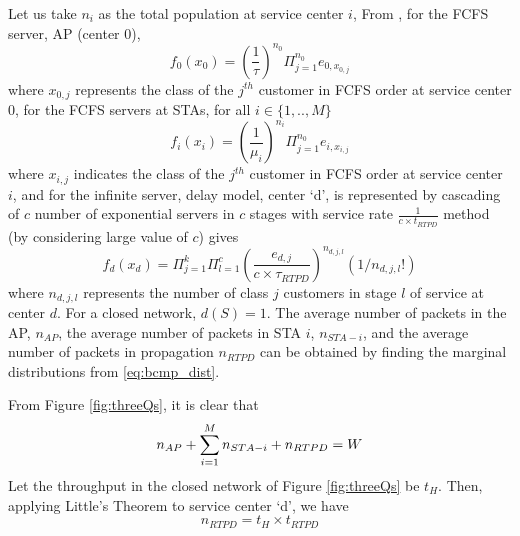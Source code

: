 \documentclass[conference]{IEEEtran}
\begin{document}
 Let us take $n_i$ as  the total population at service center $i$,
From \cite{astn_model:bcmp}, for the FCFS server, AP (center 0),
\begin{equation}
f_0(x_0) =  \left( \frac{1}{\tau} \right) ^{n_0} \Pi _{j=1}^{n_0} e_{0,x_{0,j} }
\end{equation}
where $ x_{0,j} $ represents the class of the $j^{th}$ customer in FCFS order at service center 0,
for the FCFS servers at STAs, for all $ i \in \lbrace  1,.., M \rbrace $
\begin{equation}
f_i(x_i) = \left( \frac{1}{ \mu_{i}} \right) ^{n_{i}} \Pi _{j=1}^{n_0} e_{i,x_{i,j} }
\end{equation}
where $x_{i,j}$ indicates the class of the $j^{th}$ customer in FCFS order at service center $i$,
and for the infinite server, delay model, center `d', is represented by
cascading of $c$ number of exponential servers in $c$ stages with service rate
$ \frac{1}{c \times t_{RTPD}} $  method (by considering large value of $c$) gives 
\begin{equation}
f_d(x_d) =  \Pi _{j=1}^{k} \Pi _{l=1}^{c} \left( \frac{ e_{d,j}}{ c \times \tau_{RTPD} } \right) ^{n_{d,j,l} } (1/n_{d,j,l}!)
\end{equation}
where $ n_{d,j,l} $ represents the number of class $j$ customers in stage $l$
of service at center $d$. 
For a closed network, $ d(S) = 1 $.
 The average number of  packets in the AP,  $ n_{AP } $, the average number of
packets in STA $i$,  $ n_{STA-i} $, and the average number of packets in 
propagation $ n_{RTPD}$ can be obtained by finding the marginal distributions from \eqref{eq:bcmp_dist}. 
 
From Figure \ref{fig:threeQs}, it is clear that  
\begin{equation*}
 n_{AP}  + \sum_{i=1}^{M} n_{STA-i} + n_{RTPD}  = W  \\
\end{equation*}
Let the throughput in the closed network of Figure \ref{fig:threeQs} be $t_H$.
Then, applying Little's Theorem to service center `d', we have
\begin{equation}
n_{RTPD} = t_H \times t_{RTPD} 
\end{equation}
\end{document}
